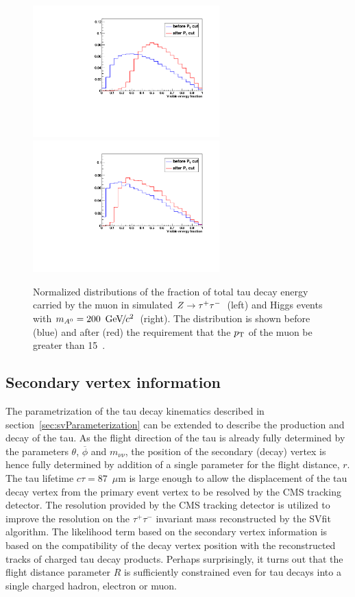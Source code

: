 \begin{figure}[t]
\begin{center}
\includegraphics*[width=72mm]{svfit_chapter/figures/scuplting_Ztautau_powheg_muon.pdf}
\includegraphics*[width=72mm]{svfit_chapter/figures/scuplting_A200_muon.pdf}
\caption[Effect of the visible \pt requirements for $Z$ and Higgs
events]{\captiontext Normalized distributions of the fraction of total tau decay
energy carried by the muon in simulated $Z\to\tau^+\tau^-$~(left) and Higgs events with
\mbox{$m_{A^0} = 200~{\,\text{Ge\hspace{-.08em}V\hspace{-0.16em}/\hspace{-0.08em}}c^\text{2}}$}~(right).  The distribution is shown before (blue) and
after (red) the requirement that the $p_{\mathrm{T}}$ of the muon be greater than
15~\GeVc.} \label{fig:ptBalancePtVisCutsCompareMasses}
\end{center}
\end{figure} 

\subsection{Secondary vertex information} 

The parametrization of the tau decay kinematics described in
section~\ref{sec:svParameterization} can be extended to describe the production
and decay of the tau.  As the flight direction of the tau is already fully
determined by the parameters $\theta$, $\overline{\phi}$ and $m_{\nu\nu}$, the
position of the secondary (decay) vertex is hence fully determined by addition
of a single parameter for the flight distance, $r$.  The tau lifetime $c\tau =
87$~$\mu$m is large enough to allow the displacement of the tau decay vertex
from the primary event vertex to be resolved by the CMS tracking detector.  The
resolution provided by the CMS tracking detector is utilized to improve the
resolution on the $\tau^{+} \tau^{-}$ invariant mass reconstructed by the SVfit
algorithm.  The likelihood term based on the secondary vertex information is
based on the compatibility of the decay vertex position with the reconstructed
tracks of charged tau decay products.  Perhaps surprisingly, it turns out that
the flight distance parameter $R$ is sufficiently constrained even for tau
decays into a single charged hadron, electron or muon.


